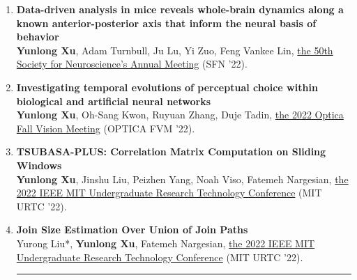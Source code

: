 \documentclass[10pt,letterpaper]{article}
\begin{document}
\begin{enumerate}
\item \textbf{Data-driven analysis in mice reveals whole-brain dynamics along a known anterior-posterior axis that inform the neural basis of behavior}\\
\textbf{Yunlong Xu}, Adam Turnbull, Ju Lu, Yi Zuo, Feng Vankee Lin, \href{https://www.sfn.org/}{the 50th Society for Neuroscience's Annual Meeting} (SFN '22).\\

\item \textbf{Investigating temporal evolutions of perceptual choice within biological and artificial neural networks}\\
\textbf{Yunlong Xu}, Oh-Sang Kwon, Ruyuan Zhang, Duje Tadin, \href{https://www.osafallvisionmeeting.org/}{the 2022 Optica Fall Vision Meeting} (OPTICA FVM '22).\\

\item \textbf{TSUBASA-PLUS: Correlation Matrix Computation on Sliding Windows}\\
\textbf{Yunlong Xu}, Jinshu Liu, Peizhen Yang, Noah Viso, Fatemeh Nargesian, \href{https://urtc.mit.edu/}{the 2022 IEEE MIT Undergraduate Research Technology Conference} (MIT URTC '22).\\

\item \textbf{Join Size Estimation Over Union of Join Paths}\\
Yurong Liu*, \textbf{Yunlong Xu}, Fatemeh Nargesian, \href{https://urtc.mit.edu/}{the 2022 IEEE MIT Undergraduate Research Technology Conference} (MIT URTC '22).\\

\vspace{2mm}
\hrule

\end{enumerate}
\end{document}

